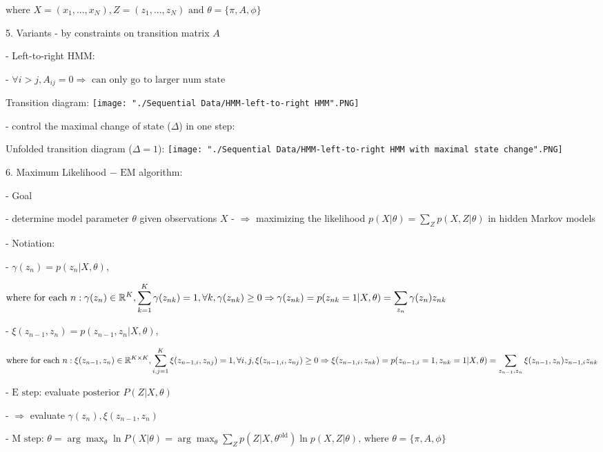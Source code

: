      $\text{where } X = (x_1,...,x_N), Z=(z_1,...,z_N) \text{ and } \theta = \{\pi,A,\phi\}$ 

5. Variants - by constraints on transition matrix $A$ 

   - Left-to-right HMM:

     - $\forall i>j,A_{ij} = 0 \Rightarrow \text{ can only go to larger num state}$ 

	Transition diagram: \texttt{[image: "./Sequential Data/HMM-left-to-right HMM".PNG]}


     - control the maximal change of state ($\Delta$) in one step: 

       Unfolded transition diagram ($\Delta=1$): \texttt{[image: "./Sequential Data/HMM-left-to-right HMM with maximal state change".PNG]}

6. Maximum Likelihood $-\text{ EM}$ algorithm:

   - Goal

     - determine model parameter $\theta$ given observations $X$ 
     - $\Rightarrow$ maximizing the likelihood $\displaystyle p(X|\theta) = \sum_Z p(X,Z|\theta)$ in hidden Markov models 

   - Notiation:

     - $\gamma(z_n) = p(z_n|X,\theta)$, 

       $\text{where for each } n: \small \displaystyle \gamma(z_n) \in \mathbb R^{K} , \sum_{k=1}^K \gamma(z_{nk}) = 1,\forall k,\gamma(z_{nk})\ge0 \\ \displaystyle\Rightarrow \gamma(z_{nk}) = p(z_{nk}=1|X,\theta) = \sum_{z_n}\gamma(z_n)z_{nk}$ 

     - $\xi(z_{n-1},z_n) = p(z_{n-1},z_n|X,\theta)$, 

       $\text{where for each } n: \small \displaystyle \xi(z_{n-1},z_n)\in\mathbb R^{K\times K},\sum_{i,j=1}^K \xi(z_{n-1,i},z_{nj} ) = 1, \forall i,j, \xi(z_{n-1,i},z_{nj})\ge0 \\ \displaystyle \Rightarrow \xi(z_{n-1,i},z_{nk}) = p(z_{n-1,i}=1,z_{nk}=1|X,\theta) = \sum_{z_{n-1},z_n}\xi(z_{n-1},z_n)z_{n-1,i} z_{nk}$ 

   - $\text{E step}$: evaluate $\text{posterior } P(Z|X,\theta)$ 

     - $\Rightarrow$ evaluate $\gamma(z_n), \xi(z_{n-1},z_n)$ 

   - $\text{M step}$: $\displaystyle \theta = \arg \max_{\theta}\ln P(X|\theta) = \arg\max_{\theta}\sum_Z p(Z|X,\theta^\text{old})\ln p(X,Z|\theta) \text{, where } \theta = \{\pi,A,\phi\} $ 

